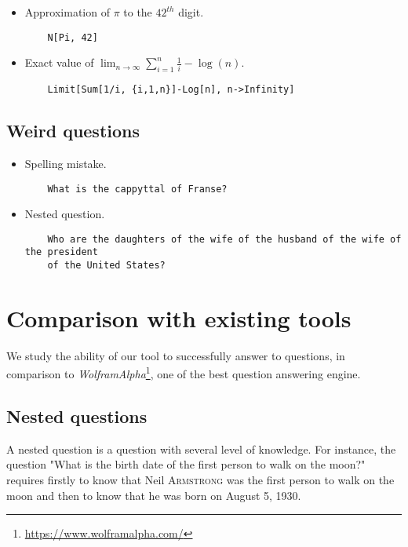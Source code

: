 \begin{itemize}
    \item Approximation of $\pi$ to the $42^{th}$ digit.
    \begin{verbatim}
    N[Pi, 42]
    \end{verbatim}

    \item Exact value of $\lim_{n\rightarrow \infty} \sum_{i=1}^n \frac{1}{i} - \log(n)$.
    \begin{verbatim}
    Limit[Sum[1/i, {i,1,n}]-Log[n], n->Infinity]
    \end{verbatim}
\end{itemize}

\subsection{Weird questions}

\begin{itemize}
    \item Spelling mistake.
    \begin{verbatim}
    What is the cappyttal of Franse?
    \end{verbatim}

    \item Nested question.
    \begin{verbatim}
    Who are the daughters of the wife of the husband of the wife of the president
    of the United States?
    \end{verbatim}
\end{itemize}

\section{Comparison with existing tools}

We study the ability of our tool to successfully answer to questions, in comparison
to \emph{WolframAlpha}\footnote{\url{https://www.wolframalpha.com/}}, one of the best
question answering engine.

\subsection{Nested questions}

A nested question is a question with several level of knowledge. For instance, the
question "What is the birth date of the first person to walk on the moon?" requires
firstly to know that Neil \textsc{Armstrong} was the first person to walk on the
moon and then to know that he was born on August 5, 1930.


